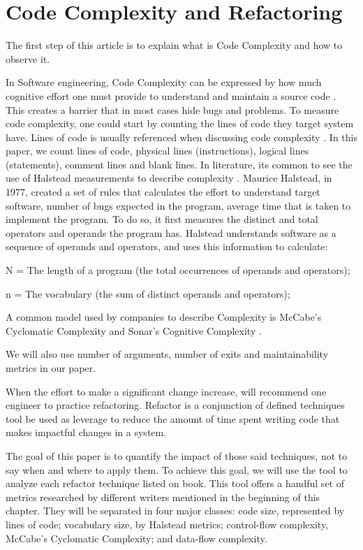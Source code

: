 \section{Code Complexity and Refactoring}

The first step of this article is to explain what is Code Complexity and how to observe it.

In Software engineering, Code Complexity can be expressed by how much cognitive effort one must provide to understand
and maintain a source code \cite{article:fmricc}. This creates a barrier that in most cases hide bugs and problems.
To measure code complexity, one could start by counting the lines of code they target system have. Lines of code is usually
referenced when discussing code complexity \cite{article:rustcc}. In this paper, we count lines of code, physical lines (instructions),
logical lines (statements), comment lines and blank lines.
In literature, its common to see the use of Halstead measurements to describe complexity \cite{article:complexity_with_halstead}.
Maurice Halstead, in 1977, created a set of rules that calculates the effort to understand target software, number of bugs
expected in the program, average time that is taken to implement the program. To do so, it first measures the distinct and total
operators and operands the program has. Halstead understands software as a sequence of operands and operators, and uses
this information to calculate:

N = The length of a program (the total occurrences of operands and operators);

n = The vocabulary (the sum of distinct operands and operators);


A common model used by companies to describe Complexity is McCabe's Cyclomatic Complexity and Sonar's Cognitive Complexity
\cite{article:sonarpaper}.

We will also use number of arguments, number of exits and maintainability metrics in our paper.


When the effort to make a significant change increase, \cite{book:refactoring} will recommend one engineer to practice
refactoring. Refactor is a conjunction of defined techniques tool be used as leverage to reduce the amount of time spent
writing code that makes impactful changes in a system.

The goal of this paper is to quantify the impact of those said techniques, not to say when and where to apply them.
To achieve this goal, we will use the \cite{article:mozilla} tool to analyze each refactor technique listed on
\cite{book:refactoring} book. This tool offers a handful set of metrics researched by
different writers mentioned in the beginning of this chapter. They will be separated in four major classes: code size,
represented by lines of code; vocabulary size, by Halstead metrics; control-flow complexity, McCabe's Cyclomatic
Complexity; and data-flow complexity.

